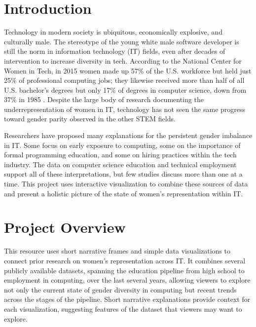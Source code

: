 \documentclass{article}
\newcommand{\bigmargins}{\vspace*{0.5in}}
\begin{document}
\bigmargins
\setcounter{page}{1}
\tableofcontents
\clearpage


\bigmargins
\section{Introduction}
Technology in modern society is ubiquitous, economically explosive, and culturally male. The stereotype of the young white male software developer is still the norm in information technology (IT) fields, even after decades of intervention to increase diversity in tech. According to the National Center for Women in Tech, in 2015 women made up 57\% of the U.S. workforce but held just 25\% of professional computing jobs; they likewise received more than half of all U.S. bachelor's degrees but only 17\% of degrees in computer science, down from 37\% in 1985 \citep{NCWIT2016Women}. Despite the large body of research documenting the underrepresentation of women in IT, technology has not seen the same progress toward gender parity observed in the other STEM fields.

Researchers have proposed many explanations for the persistent gender imbalance in IT\@. Some focus on early exposure to computing, some on the importance of formal programming education, and some on hiring practices within the tech industry. The data on computer science education and technical employment support all of these interpretations, but few studies discuss more than one at a time. This project uses interactive visualization to combine these sources of data and present a holistic picture of the state of women's representation within IT\@.



\section{Project Overview}
This resource uses short narrative frames and simple data visualizations to connect prior research on women's representation across IT\@. It combines several publicly available datasets, spanning the education pipeline from high school to employment in computing, over the last several years, allowing viewers to explore not only the current state of gender diversity in computing but recent trends across the stages of the pipeline. Short narrative explanations provide context for each visualization, suggesting features of the dataset that viewers may want to explore.
\end{document}
